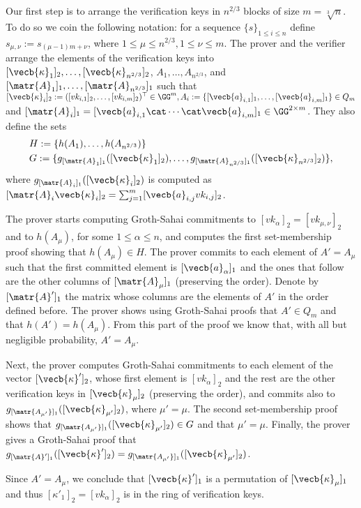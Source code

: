 Our first step is to arrange the verification keys in $n^{2/3}$ blocks of size $m=\sqrt[3]{n}$. To do so we coin the following notation: for a sequence $\{s\}_{1\leq i \leq n}$ define $s_{\mu,\nu}:=s_{(\mu-1)m+\nu}$, where  $1\leq\mu\leq n^{2/3},1\leq \nu\leq m$.  The prover and the verifier arrange the elements of the verification keys into $[\vecb{\kappa}_1]_2,\ldots, [\vecb{\kappa}_{n^{2/3}}]_2$, $A_1,\ldots, A_{n^{2/3}}$, and $[\matr{A}_1]_1,\ldots, [\matr{A}_{n^{2/3}}]_1$ such that $[\vecb{\kappa}_i]_2:= ([vk_{i,1}]_2,\ldots,[vk_{i,m}]_2)^\top\in\GG^m, A_i:=\{[\vecb{a}_{i,1}]_1,\ldots,[\vecb{a}_{i,m}]_1\}\in Q_m$ and $[\matr{A}_i]_1=[\vecb{a}_{i,1}\cat\cdots\cat\vecb{a}_{i,m}]_1\in\GG^{2\times m}$. They also define the sets
\begin{align*}
&H:=\{h(A_1),\ldots,\allowbreak h(A_{n^{2/3}})\}\\
&G:=\{g_{[\matr{A}_1]_1}([\vecb{\kappa}_1]_2),\allowbreak\ldots,g_{[\matr{A}_{n^{2/3}}]_1}([\vecb{\kappa}_{n^{2/3}}]_2)\},
\end{align*}
where $g_{[\matr{A}_i]_1}([\vecb{\kappa}_i]_2)$ is computed as $[\matr{A}_i\vecb{\kappa}_i]_2=\sum_{j=1}^m [\vecb{a}_{i,j}vk_{i,j}]_2$.

The prover starts computing Groth-Sahai commitments to $[vk_\alpha]_2=[vk_{\mu,\nu}]_2$ and to $h(A_\mu)$, for some $1\leq \alpha \leq n$, and computes the first set-membership proof showing that $h(A_\mu)\in H$.
The prover commits to each element of $A'=A_\mu$ such that the first committed element is $[\vecb{a}_\alpha]_1$ and the ones that follow are the other columns of $[\matr{A}_\mu]_1$ (preserving the order). Denote by $[\matr{A}']_1$ the matrix whose columns are the elements of $A'$ in the order defined before.  The prover shows using Groth-Sahai proofs that $A'\in Q_m$ and that $h(A')=h(A_\mu)$. From this part of the proof we know that, with all but negligible probability, $A'=A_\mu$.

Next, the prover computes Groth-Sahai commitments to each element of the vector $[\vecb{\kappa}']_2$, whose first element is $[vk_\alpha]_2$ and the rest are the other verification keys in $[\vecb{\kappa}_\mu]_2$ (preserving the order), and commits also to $g_{[\matr{A_{\mu'}}]_1}([\vecb{\kappa}_{\mu'}]_2)$, where $\mu'=\mu$. The second set-membership proof shows that $g_{[\matr{A_{\mu'}}]_1}([\vecb{\kappa}_{\mu'}]_2)\in G$ and that $\mu'=\mu$. Finally, the prover gives a Groth-Sahai proof that $g_{[\matr{A}']_1}([\vecb{\kappa}']_2)=g_{[\matr{A_{\mu'}}]_1}([\vecb{\kappa}_{\mu'}]_2)$.

Since $A'=A_\mu$, we conclude that $[\vecb{\kappa}']_1$ is a permutation of $[\vecb{\kappa}_\mu]_1$ and thus $[\kappa'_1]_2=[vk_\alpha]_2$ is in the ring of verification keys.


